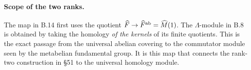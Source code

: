 \paragraph{Scope of the two ranks.}
The map in B.14 first uses the quotient
\(\widehat F\to\widehat F^{\rm ab}=\widehat M(1)\).
The \(\Lambda\)-module in B.8 is obtained by taking the homology
\emph{of the kernels} of its finite quotients. This is the exact
passage from the universal abelian covering to the commutator
module seen by the metabelian fundamental group. It is this map
that connects the rank-two construction in \S51 to the universal
homology module.
